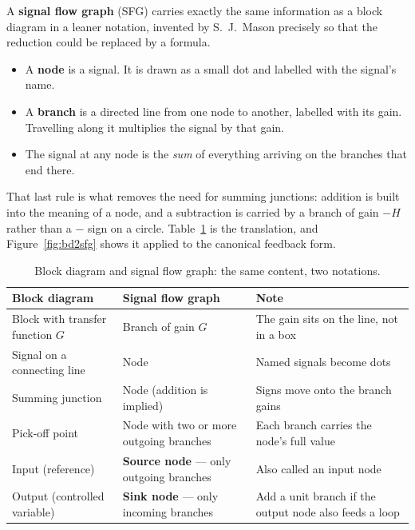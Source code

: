 \documentclass[11pt,a4paper]{article}
\begin{document}
A \textbf{signal flow graph} (SFG) carries exactly the same information as a
block diagram in a leaner notation, invented by S.~J.~Mason precisely so that
the reduction could be replaced by a formula.

\begin{itemize}[leftmargin=*]
\item A \textbf{node} is a signal. It is drawn as a small dot and labelled with
      the signal's name.
\item A \textbf{branch} is a directed line from one node to another, labelled
      with its gain. Travelling along it multiplies the signal by that gain.
\item The signal at any node is the \emph{sum} of everything arriving on the
      branches that end there.
\end{itemize}

That last rule is what removes the need for summing junctions: addition is
built into the meaning of a node, and a subtraction is carried by a branch of
gain $-H$ rather than a $-$ sign on a circle. Table~\ref{tab:dictionary}
is the translation, and Figure~\ref{fig:bd2sfg} shows it applied to the
canonical feedback form.

\begin{table}[htbp]
\centering
\caption{Block diagram and signal flow graph: the same content, two notations.}
\label{tab:dictionary}
\small
\renewcommand{\arraystretch}{1.25}
\begin{tabular}{@{}p{5.1cm}p{4.5cm}p{4.7cm}@{}}
\toprule
\textbf{Block diagram} & \textbf{Signal flow graph} & \textbf{Note}\\
\midrule
Block with transfer function $G$ & Branch of gain $G$ & The gain sits on the
line, not in a box\\
Signal on a connecting line & Node & Named signals become dots\\
Summing junction & Node (addition is implied) & Signs move onto the branch
gains\\
Pick-off point & Node with two or more outgoing branches & Each branch carries
the node's full value\\
Input (reference) & \textbf{Source node} --- only outgoing branches & Also
called an input node\\
Output (controlled variable) & \textbf{Sink node} --- only incoming branches &
Add a unit branch if the output node also feeds a loop\\
\bottomrule
\end{tabular}
\end{table}
\end{document}
